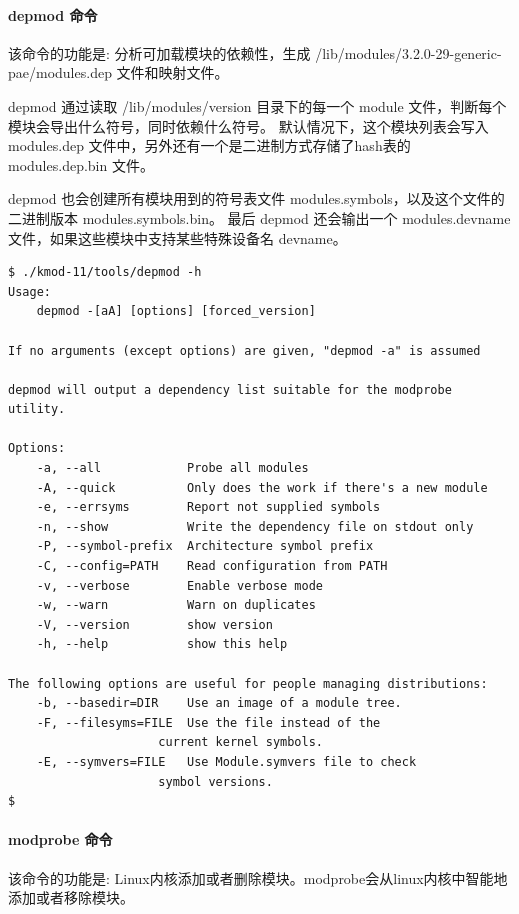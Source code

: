 \documentclass[11pt,a4paper]{article}
\begin{document}
\paragraph{depmod 命令}

该命令的功能是: 分析可加载模块的依赖性，生成
/lib/modules/3.2.0-29-generic-pae/modules.dep 文件和映射文件。

depmod 通过读取 /lib/modules/version 目录下的每一个 module
文件，判断每个模块会导出什么符号，同时依赖什么符号。
默认情况下，这个模块列表会写入 modules.dep
文件中，另外还有一个是二进制方式存储了hash表的 modules.dep.bin 文件。

depmod 也会创建所有模块用到的符号表文件
modules.symbols，以及这个文件的二进制版本 modules.symbols.bin。 最后
depmod 还会输出一个 modules.devname
文件，如果这些模块中支持某些特殊设备名 devname。

{\begin{shaded}\begin{verbatim}
$ ./kmod-11/tools/depmod -h
Usage:
    depmod -[aA] [options] [forced_version]

If no arguments (except options) are given, "depmod -a" is assumed

depmod will output a dependency list suitable for the modprobe utility.

Options:
    -a, --all            Probe all modules
    -A, --quick          Only does the work if there's a new module
    -e, --errsyms        Report not supplied symbols
    -n, --show           Write the dependency file on stdout only
    -P, --symbol-prefix  Architecture symbol prefix
    -C, --config=PATH    Read configuration from PATH
    -v, --verbose        Enable verbose mode
    -w, --warn           Warn on duplicates
    -V, --version        show version
    -h, --help           show this help

The following options are useful for people managing distributions:
    -b, --basedir=DIR    Use an image of a module tree.
    -F, --filesyms=FILE  Use the file instead of the
                     current kernel symbols.
    -E, --symvers=FILE   Use Module.symvers file to check
                     symbol versions.
$ 
\end{verbatim}\end{shaded}}
\paragraph{modprobe 命令}

该命令的功能是:
Linux内核添加或者删除模块。modprobe会从linux内核中智能地添加或者移除模块。
\end{document}
